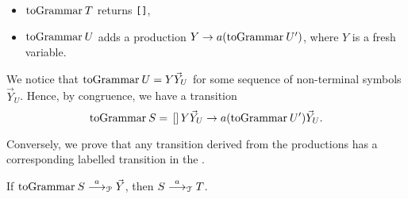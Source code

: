 \begin{itemizeproof}
\begin{itemize}
  \begin{itemize}
  \item $\toGrammarf T$  returns \lstinline{[]},
  \item $\toGrammarf U$ adds a production
    $Y \rightarrow a (\toGrammarf U')$, where $Y$ is a fresh
    variable.
  \end{itemize}
  We notice that $\toGrammarf U = Y\vec Y_U$ for some sequence of
  non-terminal symbols $\vec Y_U$. Hence, by congruence, we have a
  transition
  \[\toGrammarf S = \text{\lstinline{[]}} Y
    \vec Y_U \rightarrow a (\toGrammarf{U')} \vec Y_U.\]
\end{itemize}
\end{itemizeproof}

Conversely, we prove that any transition derived from the productions
has a corresponding labelled transition in the \LTS.

\begin{lemma}
  If $\toGrammarf S \LTSderivesP \vec Y$, then $S\stackrel{a}{\longrightarrow}_\mathcal T
  T$.\\ 
\end{lemma}

